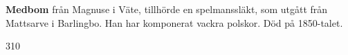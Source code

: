 \textbf{Medbom} från Magnuse i Väte, tillhörde en spelmanssläkt, som utgått från Mattsarve i Barlingbo.
Han har komponerat vackra polskor. Död på 1850-talet. 

310 
